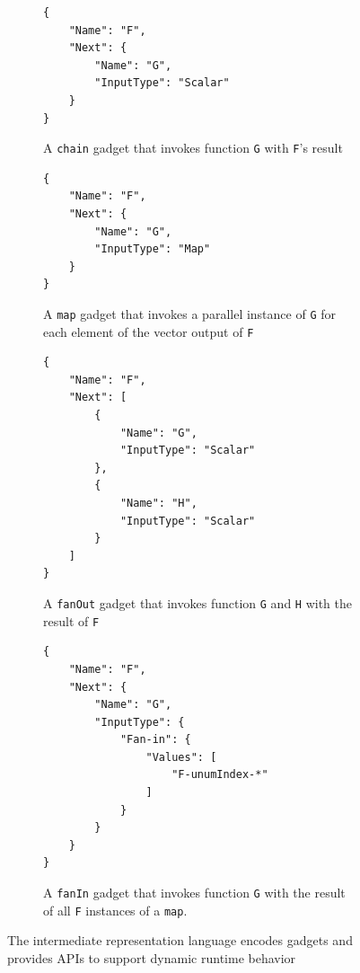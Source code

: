 \begin{figure}[t]

    \begin{subfigure}[t]{0.3\textwidth}
        \begin{verbatim}
{
    "Name": "F",
    "Next": {
        "Name": "G",
        "InputType": "Scalar"
    }
}
    \end{verbatim}
        \caption{A \texttt{chain} gadget that invokes function \texttt{G} with
        \texttt{F}'s result}
        \label{fig:gadget-examples-chain}
    \end{subfigure}

    \begin{subfigure}[t]{0.3\textwidth}
        \begin{verbatim}
{
    "Name": "F",
    "Next": {
        "Name": "G",
        "InputType": "Map"
    }
}
        \end{verbatim}
        \caption{A \texttt{map} gadget that invokes a parallel instance of
        \texttt{G} for each element of the vector output of \texttt{F}}
        \label{fig:gadget-examples-map}
    \end{subfigure}

    \begin{subfigure}[t]{0.3\textwidth}
        \begin{verbatim}
{
    "Name": "F",
    "Next": [
        {
            "Name": "G",
            "InputType": "Scalar"
        },
        {
            "Name": "H",
            "InputType": "Scalar"
        }
    ]
}
        \end{verbatim}
        \caption{A \texttt{fanOut} gadget that invokes function \texttt{G} and
        \texttt{H} with the result of \texttt{F}}
        \label{fig:gadget-examples-fanout}
    \end{subfigure}

    \begin{subfigure}[t]{0.3\textwidth}
        \begin{verbatim}
{
    "Name": "F",
    "Next": {
        "Name": "G",
        "InputType": {
            "Fan-in": {
                "Values": [
                    "F-unumIndex-*"
                ]
            }
        }
    }
}
        \end{verbatim}
        \caption{A \texttt{fanIn} gadget that invokes function \texttt{G} with
        the result of all \texttt{F} instances of a \texttt{map}.}
        \label{fig:gadget-examples-fanin}
    \end{subfigure}
    
    \caption{The \name{} intermediate representation language encodes gadgets
    and provides APIs to support dynamic runtime behavior}
    \label{fig:gadget-examples}
\end{figure}

